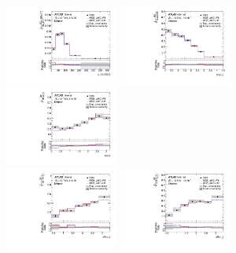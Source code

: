 \begin{figure}[ht]
  \centering
  \includegraphics[width=0.33\textwidth]{figures/diff_xsec/normalized-unfolded-distributions/tty_prod_dilep/DL_tty_prod_ptll_unfolded_normalized.pdf}%
  \includegraphics[width=0.33\textwidth]{figures/diff_xsec/normalized-unfolded-distributions/tty_prod_dilep/DL_tty_prod_dEtall_unfolded_normalized.pdf}%
  \includegraphics[width=0.33\textwidth]{figures/diff_xsec/normalized-unfolded-distributions/tty_prod_dilep/DL_tty_prod_dPhill_unfolded_normalized.pdf}\\
  \includegraphics[width=0.33\textwidth]{figures/diff_xsec/normalized-unfolded-distributions/tty_prod_dilep/DL_tty_prod_drphl1_unfolded_normalized.pdf}%
  \includegraphics[width=0.33\textwidth]{figures/diff_xsec/normalized-unfolded-distributions/tty_prod_dilep/DL_tty_prod_drphl2_unfolded_normalized.pdf}%

\end{figure}
